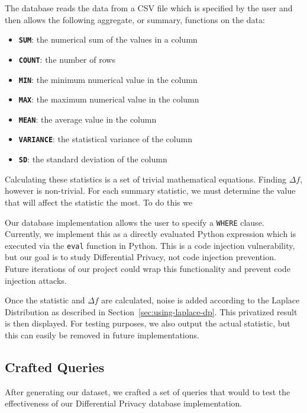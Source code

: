 \documentclass[conference,11pt]{IEEEtran}
\begin{document}
The database reads the data from a CSV file which is specified by the user and
then allows the following aggregate, or summary, functions on the data:
\begin{itemize}
    \item \textbf{\texttt{SUM}}: the numerical sum of the values in a column
    \item \textbf{\texttt{COUNT}}: the number of rows
    \item \textbf{\texttt{MIN}}: the minimum numerical value in the column
    \item \textbf{\texttt{MAX}}: the maximum numerical value in the column
    \item \textbf{\texttt{MEAN}}: the average value in the column
    \item \textbf{\texttt{VARIANCE}}: the statistical variance of the column
    \item \textbf{\texttt{SD}}: the standard deviation of the column
\end{itemize}

Calculating these statistics is a set of trivial mathematical equations.
Finding $\Delta f$, however is non-trivial. For each summary statistic, we must
determine the value that will affect the statistic the most. To do this we

Our database implementation allows the user to specify a \texttt{WHERE} clause.
Currently, we implement this as a directly evaluated Python expression which is
executed via the \texttt{eval} function in Python. This is a code injection
vulnerability, but our goal is to study Differential Privacy, not code injection
prevention. Future iterations of our project could wrap this functionality and
prevent code injection attacks.


Once the statistic and $\Delta f$ are calculated, noise is added according to
the Laplace Distribution as described in Section~\ref{sec:using-laplace-dp}.
This privatized result is then displayed. For testing purposes, we also output
the actual statistic, but this can easily be removed in future implementations.

\subsection{Crafted Queries}\label{sec:crafted-queries}
After generating our dataset, we crafted a set of queries that would to test the
effectiveness of our Differential Privacy database implementation.
\end{document}
